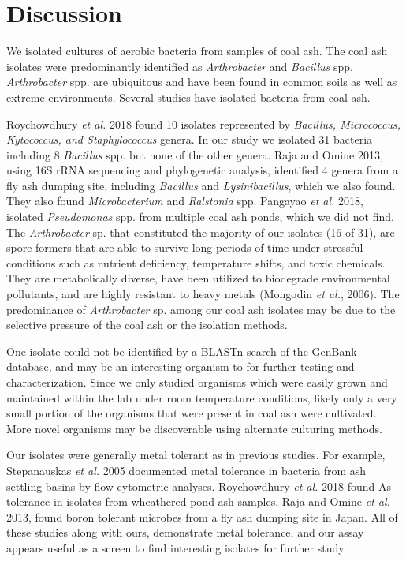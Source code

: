 \documentclass[ms, hidelinks]{uncgdissertationexp3}
\theoremstyle{plain}
\theoremstyle{definition}
\theoremstyle{remark}
\begin{document}
\section{Discussion}\label{discussion-1}
We isolated cultures of aerobic bacteria from samples of coal ash. The coal ash isolates were predominantly identified as \emph{Arthrobacter} and \emph{Bacillus} spp. \emph{Arthrobacter} spp. are ubiquitous and have been found in common soils as well as extreme environments. Several studies have isolated bacteria from coal ash. 

Roychowdhury \emph{et al.} 2018 found 10 isolates represented by \emph{Bacillus, Micrococcus, Kytococcus, and Staphylococcus} genera. In our study we isolated 31 bacteria including 8 \emph{Bacillus} spp. but none of the other genera.  Raja and Omine 2013, using 16S rRNA sequencing and phylogenetic analysis, identified 4 genera from a fly ash dumping site, including \emph{Bacillus} and \emph{Lysinibacillus}, which we also found. They also found \emph{Microbacterium} and \emph{Ralstonia} spp. Pangayao \emph{et al.} 2018, isolated \emph{Pseudomonas} spp. from multiple coal ash ponds, which we did not find. The \emph{Arthrobacter} sp. that constituted the majority of our isolates (16 of 31), are spore-formers that are able to survive long periods of time under stressful conditions such as nutrient deficiency, temperature shifts, and toxic chemicals. They are metabolically diverse, have been utilized to biodegrade environmental pollutants, and are highly resistant to heavy metals (Mongodin \emph{et al.}, 2006). The predominance of \emph{Arthrobacter} sp. among our coal ash isolates may be due to the selective pressure of the coal ash or the isolation methods. 

One isolate could not be identified by a BLASTn search of the GenBank database, and may be an interesting organism to for further testing and characterization. Since we only studied organisms which were easily grown and maintained within the lab under room temperature conditions, likely only a very small portion of the organisms that were present in coal ash  were cultivated. More novel organisms may be discoverable using alternate culturing methods. 

Our isolates were generally metal tolerant as in previous studies. For example, Stepanauskas \emph{et al.} 2005 documented metal tolerance in bacteria from ash settling basins by flow cytometric analyses. Roychowdhury \emph{et al.} 2018 found As tolerance in isolates from wheathered pond ash samples.  Raja and Omine \emph{et al.} 2013, found boron tolerant microbes from a fly ash dumping site in Japan. All of these studies along with ours, demonstrate metal tolerance, and our assay appears useful as a screen to find interesting isolates for further study.
\end{document}
